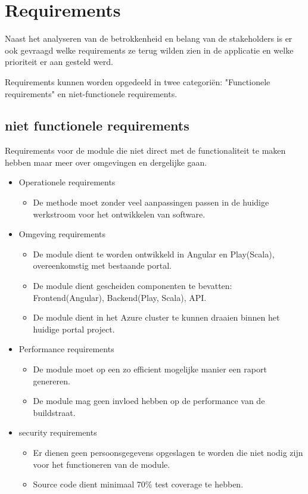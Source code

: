 \section{Requirements}\label{sec:requirements}
Naast het analyseren van de betrokkenheid en belang van de stakeholders is er ook gevraagd welke requirements ze terug wilden zien in de applicatie en welke prioriteit er aan gesteld werd.

Requirements kunnen worden opgedeeld in twee categoriën: "Functionele requirements" en niet-functionele requirements.

\subsection{niet functionele requirements}\label{subsec:niet-functionele-requirements}
Requirements voor de module die niet direct met de functionaliteit te maken hebben maar meer over omgevingen en dergelijke gaan.
\begin{itemize}
    \item Operationele requirements
        \begin{itemize}
            \item De methode moet zonder veel aanpassingen passen in de huidige werkstroom voor het ontwikkelen van software.
        \end{itemize}
    \item Omgeving requirements
        \begin{itemize}
            \item De module dient te worden ontwikkeld in Angular en Play(Scala), overeenkomstig met bestaande portal.
            \item De module dient gescheiden componenten te bevatten: Frontend(Angular), Backend(Play, Scala), API.
            \item De module dient in het Azure cluster te kunnen draaien binnen het huidige portal project.
        \end{itemize}
    \item Performance requirements
        \begin{itemize}
            \item De module moet op een zo efficient mogelijke manier een raport genereren.
            \item De module mag geen invloed hebben op de performance van de buildstraat.
        \end{itemize}
    \item security requirements
        \begin{itemize}
            \item Er dienen geen persoonsgegevens opgeslagen te worden die niet nodig zijn voor het functioneren van de module.
            \item Source code dient minimaal 70\% test coverage te hebben.
        \end{itemize}
\end{itemize}

